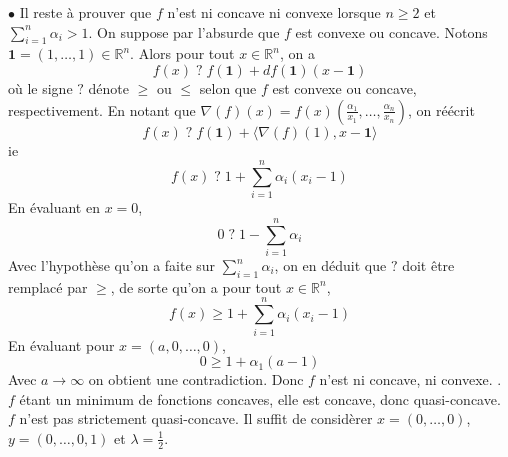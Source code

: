 \documentclass{report}
\begin{document}
$\bullet$ Il reste à prouver que $f$ n'est ni concave ni convexe lorsque $n\geq 2$ et  $\displaystyle \sum_{i=1}^n \alpha_i > 1$. On suppose par l'absurde que $f$ est convexe ou concave. Notons $\mathbf{1}=(1,\ldots,1)\in \mathbb R^n$. Alors pour tout $x\in \mathbb R^n$, on a $$f(x) \;?\; f(\mathbf 1) + df(\mathbf 1)(x- \mathbf 1)$$ où le signe $?$ dénote $\geq$ ou $\leq$ selon que $f$ est convexe ou concave, respectivement.
En notant que $\nabla(f)(x)=f(x)(\frac{\alpha_1}{x_1},\ldots,\frac{\alpha_n}{x_n})$, on réécrit
$$ f(x) \;?\; f(\mathbf 1) + \langle \nabla(f)(1),x- \mathbf 1\rangle$$
ie 
$$ f(x) \;?\; 1 + \sum_{i=1}^n \alpha_i(x_i-1)$$
 En évaluant en $x=0$, $$0 \;?\; 1 -\sum_{i=1}^n \alpha_i  $$
 Avec l'hypothèse qu'on a faite sur $\displaystyle \sum_{i=1}^n \alpha_i$, on en déduit que $?$ doit être remplacé par $\geq$, de sorte qu'on a pour tout $x\in \mathbb R^n$, $$f(x)\geq  1 + \sum_{i=1}^n \alpha_i(x_i-1)$$
 En évaluant pour $x=(a,0,\ldots,0)$, $$0\geq 1+\alpha_1(a-1)$$
 Avec $a\to \infty$ on obtient une contradiction. Donc $f$ n'est ni concave, ni convexe.
 \newline {}. $f$ étant un minimum de fonctions concaves, elle est concave, donc quasi-concave. \newline
$f$ n'est pas strictement quasi-concave. Il suffit de considèrer $x=(0,\ldots,0)$, $y=(0,\ldots,0,1)$ et $\lambda=\frac{1}{2}$.
\end{document}
